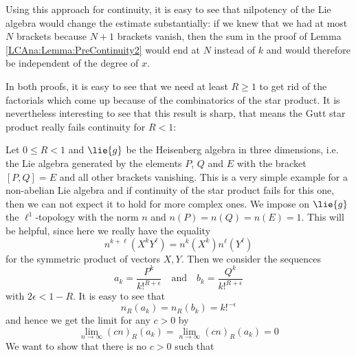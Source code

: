 Using this approach for continuity, it is easy to see that nilpotency
of the Lie algebra would change the estimate substantially: if we knew that
we had at most $N$ brackets because $N + 1$ brackets vanish,
then the sum in the proof of Lemma \ref{LCAna:Lemma:PreContinuity2}
would end at $N$ instead of $k$ and would therefore be independent of
the degree of $x$.


In both proofs, it is easy to see that we need at least $R \geq 1$ to
get rid of the factorials which come up because of the combinatorics
of the star product. It is nevertheless interesting to see that this
result is sharp, that means the Gutt star product really fails
continuity for $R < 1$:
\begin{example}
    \label{LCAna:Ex:HeisenbergAlgebra}%
    Let $0 \leq R < 1$ and $\lie{g}$ be the Heisenberg algebra in three 
    dimensions, i.e. the Lie algebra generated by the elements 
    $P$, $Q$ and $E$ with the bracket $[P,Q] = E$ and all other brackets
    vanishing. This is a very simple example for a non-abelian Lie algebra
    and if continuity of the star product fails for this one, then we
    can not expect it to hold for more complex ones. We impose on
    $\lie{g}$ the $\ell^1$-topology with the norm $n$ and $n(P) = n(Q)
    = n(E) = 1$. This will be helpful, since here we really have the equality
    \begin{equation*}
    		n^{k + \ell} \left( X^k Y^\ell \right)
    		=
    		n^k \left( X^k \right)
    		n^\ell \left( Y^\ell \right)
    \end{equation*}
    for the symmetric product of vectors $X, Y$. Then we consider 
    the sequences
    \begin{equation*}
        a_k
        =
        \frac{P^k}{k!^{R + \epsilon}}
        \quad
        \textrm{and}
        \quad
        b_k
        =
        \frac{Q^k}{k!^{R + \epsilon}}
    \end{equation*}
    with $2 \epsilon < 1 - R$. It is easy to see that
    \begin{equation*}
        n_R(a_k)
        =
        n_R(b_k)
        =
        k!^{- \epsilon}
    \end{equation*}
    and hence we get the limit for any $c > 0$ by
    \begin{equation*}
     	\lim_{n \longrightarrow \infty}
     	(cn)_R(a_k)
     	=
     	\lim_{n \longrightarrow \infty}
     	(cn)_R(a_k)
     	=
     	0
    \end{equation*}
    We want to show that there is no $c > 0$ such that

\end{example}

